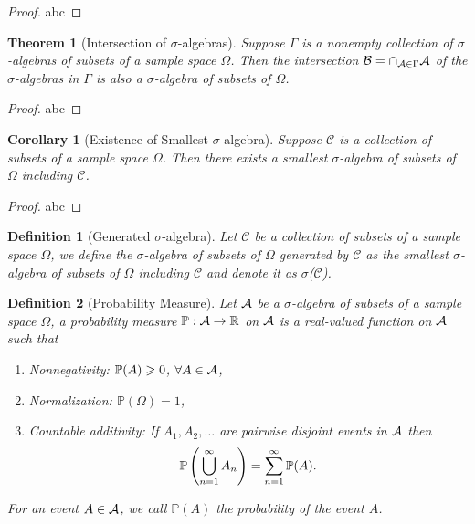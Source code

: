 \documentclass[openany,12pt]{book}
\newtheorem{theorem}{Theorem}[chapter]
\newtheorem{corollary}{Corollary}[chapter]
\newtheorem{definition}{Definition}[chapter]
\begin{document}
\begin{proof}
  abc
\end{proof}

\begin{theorem}[Intersection of $\sigma$-algebras]
  Suppose $\Gamma$ is a nonempty collection of $\sigma$-algebras of subsets of a sample space $\Omega$. Then the intersection $\mathcal{B}=\cap_{\mathcal{A}\in\Gamma}\mathcal{A}$ of the $\sigma$-algebras in $\Gamma$ is also a $\sigma$-algebra of subsets of $\Omega$.
\end{theorem}

\begin{proof}
  abc
\end{proof}

\begin{corollary}[Existence of Smallest $\sigma$-algebra]
  Suppose $\mathcal{C}$ is a collection of subsets of a sample space $\Omega$. Then there exists a smallest $\sigma$-algebra of subsets of $\Omega$ including $\mathcal{C}$.
\end{corollary}

\begin{proof}
  abc
\end{proof}

\begin{definition}[Generated $\sigma$-algebra]
  Let $\mathcal{C}$ be a collection of subsets of a sample space $\Omega$, we define the $\sigma$-algebra of subsets of $\Omega$ generated by $\mathcal{C}$ as the smallest $\sigma$-algebra of subsets of $\Omega$ including $\mathcal{C}$ and denote it as $\sigma$($\mathcal{C}$).
\end{definition}

\begin{definition}[Probability Measure]
  Let $\mathcal{A}$ be a $\sigma$-algebra of subsets of a sample space $\Omega$, a probability measure $\mathbb{P}:\mathcal{A}\to\mathbb{R}$ on $\mathcal{A}$ is a real-valued function on $\mathcal{A}$ such that
  \begin{enumerate}
    \item Nonnegativity: $\mathbb{P}(A)\geqslant0$, $\forall A\in\mathcal{A}$,
    \item Normalization: $\mathbb{P}(\Omega)=1$,
    \item Countable additivity: If $A_1,A_2,\dots$ are pairwise disjoint events in $\mathcal{A}$ then $$\mathbb{P}\left(\bigcup_{n=1}^\infty A_n \right)=\sum_{n=1}^{\infty} \mathbb{P}(A).$$
  \end{enumerate}
  For an event $A\in\mathcal{A}$, we call $\mathbb{P}(A)$ the probability of the event $A$.
\end{definition}
\end{document}
